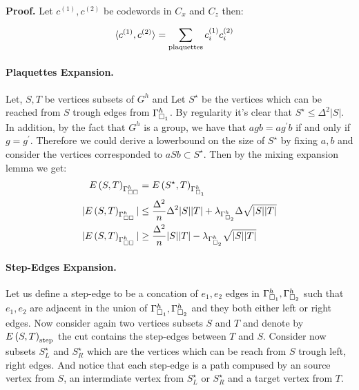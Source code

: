 \documentclass{article}
\begin{document}
\begin{multicols*}{2}
\textbf{Proof.} Let $c^{\left( 1 \right)}, c^{\left( 2 \right)}$ be codewords in $C_{x}$ and $C_{z}$ then: 

\begin{equation*}
  \begin{split}
    \braket{c^{\left( 1 \right)}, c^{\left( 2 \right)}} &= \sum_{\text{plaquettes}}c^{\left( 1 \right)}_{i} c^{\left( 2 \right)}_{i}
  \end{split}
\end{equation*}
	\paragraph{Plaquettes Expansion.} Let, $S , T$ be vertices subsets of $G^{h}$ and Let $S^{\star}$ be the vertices which can be reached from $S$ trough edges from $\Gamma_{\square_{1}}^{h}$. By regularity it's clear that $S^{\star}\le \Delta^{2}|S|$. In addition, by the fact that $G^{h}$ is a group, we have that $agb = ag^{\prime}b$ if and only if $g = g^{\prime}$. 
	Therefore we could derive a lowerbound on the size of $S^{\star}$ by fixing $a,b$ and consider the vertices corresponded to $aSb \subset S^{\star}$.    
	Then by the mixing expansion lemma we get: 
	\begin{equation*}
	  \begin{split}
	  E\left( S,T \right)_{\Gamma_{\square \square }^{h}} &= E\left( S^{\star}, T  \right)_{\Gamma_{\square_{1}}^{h}} \\
	|E\left( S,T \right)_{\Gamma_{\square \square }^{h}}| &\le \frac{\Delta^{2}}{n}\Delta^{2}|S||T| + \lambda_{\Gamma_{\square_{2}}^{h}}\Delta\sqrt{|S||T|} \\ 
      |E\left( S,T \right)_{\Gamma_{\square \square }^{h}}| &\ge \frac{\Delta^{2}}{n}|S||T| - \lambda_{\Gamma_{\square_{2}}^{h}}\sqrt{|S||T|}  
	  \end{split}
	\end{equation*}
	\paragraph{Step-Edges Expansion.} Let us define a step-edge to be a concation of $e_{1},e_{2}$ edges in $\Gamma_{\square_{1}}^{h}, \Gamma_{\square_{2}}^{h}$ such that $e_{1},e_{2}$ are adjacent in the union of $\Gamma_{\square_{1}}^{h}, \Gamma_{\square_{2}}^{h}$ and they both either left or right edges. 
	Now consider again two vertices subsets $S$ and $T$ and denote by $ E\left( S,T \right)_{\text{step}} $ the cut contains the step-edges between $T$ and $S$.
	Consider now subsets $S^{\star}_{L}$ and $S^{\star}_{R}$ which are the vertices which can be reach from $S$ trough left, right edges. And notice that each step-edge is a path compused by an source vertex from $S$, an intermdiate vertex from $S^{\star}_{L}$ or $S^{\star}_{R}$ and a target vertex from $T$. 


\end{multicols*}
\end{document}
